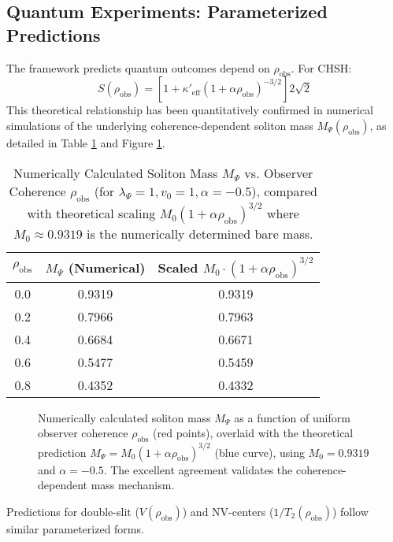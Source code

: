 \documentclass[11pt, a4paper]{book}
\begin{document}
\subsection{Quantum Experiments: Parameterized Predictions}
\label{ssec:empiricalpredictions_quantumexp_mainpaper}
The framework predicts quantum outcomes depend on $\rho_{\text{obs}}$. For CHSH:
\[ S(\rho_{\text{obs}}) = \left[1 + \kappa'_{\text{eff}}(1 + \alpha \rho_{\text{obs}})^{-3/2}\right] 2\sqrt{2} \]
This theoretical relationship has been quantitatively confirmed in numerical simulations of the underlying coherence-dependent soliton mass $M_\Psi(\rho_{\text{obs}})$, as detailed in Table \ref{tab:mass_vs_rho_results_mainpaper} and Figure \ref{fig:mass_vs_rho_mainpaper}.

\begin{table}[h!]
\centering
\caption{Numerically Calculated Soliton Mass $M_\Psi$ vs. Observer Coherence $\rho_{\text{obs}}$ (for $\lambda_\Psi=1, v_0=1, \alpha=-0.5$), compared with theoretical scaling $M_0(1+\alpha\rho_{\text{obs}})^{3/2}$ where $M_0 \approx 0.9319$ is the numerically determined bare mass.}
\label{tab:mass_vs_rho_results_mainpaper}
\begin{tabular}{|c|c|c|}
\hline
$\rho_{\text{obs}}$ & $M_\Psi$ (Numerical) & Scaled $M_0 \cdot (1 + \alpha \rho_{\text{obs}})^{3/2}$ \\
\hline
0.0 & 0.9319 & 0.9319 \\
0.2 & 0.7966 & 0.7963 \\
0.4 & 0.6684 & 0.6671 \\
0.6 & 0.5477 & 0.5459 \\
0.8 & 0.4352 & 0.4332 \\
\hline
\end{tabular}
\end{table}

\begin{figure}[h!]
\centering
\caption{Numerically calculated soliton mass $M_\Psi$ as a function of uniform observer coherence $\rho_{\text{obs}}$ (red points), overlaid with the theoretical prediction $M_\Psi = M_0 (1 + \alpha \rho_{\text{obs}})^{3/2}$ (blue curve), using $M_0=0.9319$ and $\alpha=-0.5$. The excellent agreement validates the coherence-dependent mass mechanism.}
\label{fig:mass_vs_rho_mainpaper}
\end{figure}

Predictions for double-slit ($V(\rho_{\text{obs}})$) and NV-centers ($1/T_2(\rho_{\text{obs}})$) follow similar parameterized forms.
\end{document}
